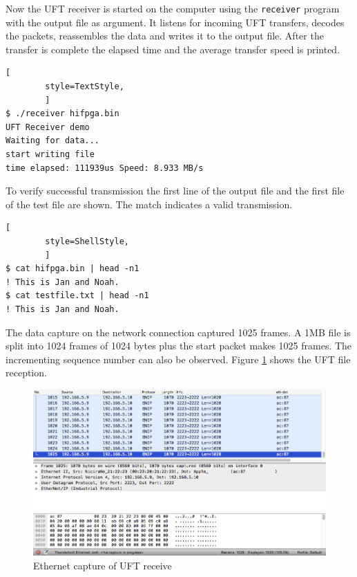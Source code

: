 Now the UFT receiver is started on the computer using the \texttt{receiver}
program with the output file as argument. It listens for incoming UFT transfers,
decodes the packets, reassembles the data and writes it to the output file.
After the transfer is complete the elapsed time and the average
transfer speed is printed.

\vspace{1ex}
    \begin{lstlisting}[
        style=TextStyle, 
        ]
$ ./receiver hifpga.bin
UFT Receiver demo
Waiting for data...
start writing file
time elapsed: 111939us Speed: 8.933 MB/s
\end{lstlisting}
\vspace{1ex}

To verify successful transmission the first line of the output file and the
first file of the test file are shown. The match indicates a valid transmission.

\vspace{1ex}
    \begin{lstlisting}[
        style=ShellStyle, 
        ]
$ cat hifpga.bin | head -n1
! This is Jan and Noah.
$ cat testfile.txt | head -n1
! This is Jan and Noah.
\end{lstlisting}
\vspace{1ex}

The data capture on the network connection captured 1025 frames. A 1MB file is
split into 1024 frames of 1024 bytes plus the start packet makes 1025 frames.
The incrementing sequence number can also be observed. Figure 
\ref{fig:wiresharkreceive} shows the UFT file reception.
\\

\begin{figure}[b!]
    \centering
    \includegraphics[width=\textwidth] {images/validation/wiresharkreceive.png}
    \caption{Ethernet capture of UFT receive}
    \label{fig:wiresharkreceive}
\end{figure}

